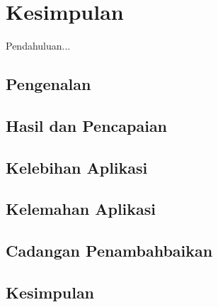 \chapter{Kesimpulan}\label{c1}
Pendahuluan...

\section{Pengenalan}
\section{Hasil dan Pencapaian}
\section{Kelebihan Aplikasi}
\section{Kelemahan Aplikasi}
\section{Cadangan Penambahbaikan}

\section{Kesimpulan}

